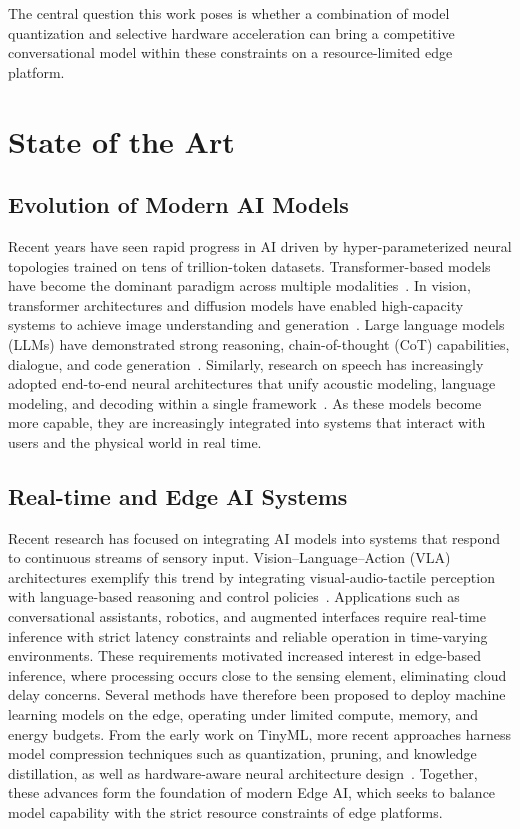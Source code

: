 The central question this work poses is whether a combination of model quantization
and selective hardware acceleration can bring a competitive conversational model
within these constraints on a resource-limited edge platform.

\section{State of the Art}
\label{sec:sota}

\subsection{Evolution of Modern AI Models}
Recent years have seen rapid progress in AI driven by hyper-parameterized neural
topologies trained on tens of trillion-token datasets. Transformer-based models
have become the dominant paradigm across multiple modalities~\cite{10433480}. In
vision, transformer architectures and diffusion models have enabled high-capacity
systems to achieve image understanding and generation~\cite{10902142}. Large
language models (LLMs) have demonstrated strong reasoning, chain-of-thought (CoT)
capabilities, dialogue, and code generation~\cite{10.1145-3747588}. Similarly,
research on speech has increasingly adopted end-to-end neural architectures that
unify acoustic modeling, language modeling, and decoding within a single
framework~\cite{app142411583}. As these models become more capable, they are
increasingly integrated into systems that interact with users and the physical
world in real time.

\subsection{Real-time and Edge AI Systems}
Recent research has focused on integrating AI models into systems that respond to
continuous streams of sensory input. Vision--Language--Action (VLA) architectures
exemplify this trend by integrating visual-audio-tactile perception with
language-based reasoning and control
policies~\cite{huang2026tactilevla,huang2026tafvlatactileforcealignmentvisionlanguageaction,bi2025vlatouchenhancingvisionlanguageactionmodels}.
Applications such as conversational assistants, robotics, and augmented interfaces
require real-time inference with strict latency constraints and reliable operation
in time-varying environments. These requirements motivated increased interest in
edge-based inference, where processing occurs close to the sensing element,
eliminating cloud delay concerns. Several methods have therefore been proposed to
deploy machine learning models on the edge, operating under limited compute, memory,
and energy budgets. From the early work on TinyML, more recent approaches harness
model compression techniques such as quantization, pruning, and knowledge
distillation, as well as hardware-aware neural architecture
design~\cite{dnn_compression}. Together, these advances form the foundation of
modern Edge AI, which seeks to balance model capability with the strict resource
constraints of edge platforms.

